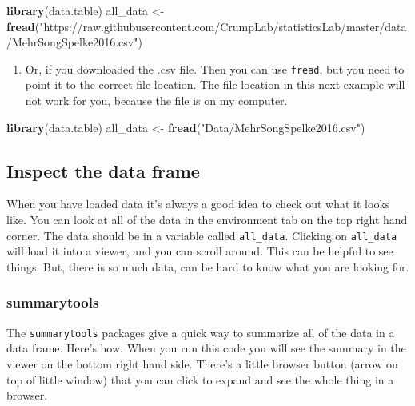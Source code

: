 \documentclass[]{book}
\newenvironment{Shaded}{\begin{snugshade}}{\end{snugshade}}
\newcommand{\KeywordTok}[1]{\textcolor[rgb]{0.13,0.29,0.53}{\textbf{{#1}}}}
\newcommand{\StringTok}[1]{\textcolor[rgb]{0.31,0.60,0.02}{{#1}}}
\newcommand{\NormalTok}[1]{{#1}}
\providecommand{\tightlist}{%
  \setlength{\itemsep}{0pt}\setlength{\parskip}{0pt}}
\theoremstyle{definition}
\theoremstyle{definition}
\theoremstyle{definition}
\theoremstyle{remark}
\begin{document}
\begin{Shaded}
\begin{Highlighting}[]
\KeywordTok{library}\NormalTok{(data.table)}
\NormalTok{all_data <-}\StringTok{ }\KeywordTok{fread}\NormalTok{(}\StringTok{"https://raw.githubusercontent.com/CrumpLab/statisticsLab/master/data/MehrSongSpelke2016.csv"}\NormalTok{)}
\end{Highlighting}
\end{Shaded}

\begin{enumerate}
\def\labelenumi{\arabic{enumi}.}
\setcounter{enumi}{1}
\tightlist
\item
  Or, if you downloaded the .csv file. Then you can use \texttt{fread},
  but you need to point it to the correct file location. The file
  location in this next example will not work for you, because the file
  is on my computer.
\end{enumerate}

\begin{Shaded}
\begin{Highlighting}[]
\KeywordTok{library}\NormalTok{(data.table)}
\NormalTok{all_data <-}\StringTok{ }\KeywordTok{fread}\NormalTok{(}\StringTok{"Data/MehrSongSpelke2016.csv"}\NormalTok{)}
\end{Highlighting}
\end{Shaded}

\subsection{Inspect the data frame}\label{inspect-the-data-frame}

When you have loaded data it's always a good idea to check out what it
looks like. You can look at all of the data in the environment tab on
the top right hand corner. The data should be in a variable called
\texttt{all\_data}. Clicking on \texttt{all\_data} will load it into a
viewer, and you can scroll around. This can be helpful to see things.
But, there is so much data, can be hard to know what you are looking
for.

\subsubsection{summarytools}\label{summarytools-1}

The \texttt{summarytools} packages give a quick way to summarize all of
the data in a data frame. Here's how. When you run this code you will
see the summary in the viewer on the bottom right hand side. There's a
little browser button (arrow on top of little window) that you can click
to expand and see the whole thing in a browser.
\end{document}
